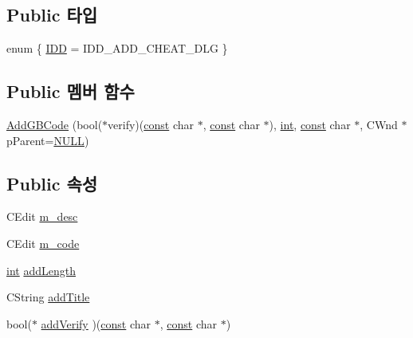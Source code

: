 \subsection*{Public 타입}
\begin{DoxyCompactItemize}
\item 
enum \{ \mbox{\hyperlink{class_add_g_b_code_a2dd2d84fa89620e9d1bd9816ac698df9a796ce5251d56e030eaec4941c10b6a17}{I\+DD}} = I\+D\+D\+\_\+\+A\+D\+D\+\_\+\+C\+H\+E\+A\+T\+\_\+\+D\+LG
 \}
\end{DoxyCompactItemize}
\subsection*{Public 멤버 함수}
\begin{DoxyCompactItemize}
\item 
\mbox{\hyperlink{class_add_g_b_code_a99be74c9c22f954a6a83fb1e8eba7b29}{Add\+G\+B\+Code}} (bool($\ast$verify)(\mbox{\hyperlink{getopt1_8c_a2c212835823e3c54a8ab6d95c652660e}{const}} char $\ast$, \mbox{\hyperlink{getopt1_8c_a2c212835823e3c54a8ab6d95c652660e}{const}} char $\ast$), \mbox{\hyperlink{_util_8cpp_a0ef32aa8672df19503a49fab2d0c8071}{int}}, \mbox{\hyperlink{getopt1_8c_a2c212835823e3c54a8ab6d95c652660e}{const}} char $\ast$, C\+Wnd $\ast$p\+Parent=\mbox{\hyperlink{_system_8h_a070d2ce7b6bb7e5c05602aa8c308d0c4}{N\+U\+LL}})
\end{DoxyCompactItemize}
\subsection*{Public 속성}
\begin{DoxyCompactItemize}
\item 
C\+Edit \mbox{\hyperlink{class_add_g_b_code_af67488ee0354c39ce9c818e7f389e74f}{m\+\_\+desc}}
\item 
C\+Edit \mbox{\hyperlink{class_add_g_b_code_a1336063b1498bee29c2a9df7273d8ca9}{m\+\_\+code}}
\item 
\mbox{\hyperlink{_util_8cpp_a0ef32aa8672df19503a49fab2d0c8071}{int}} \mbox{\hyperlink{class_add_g_b_code_abed904b4077498637455cbd6f829a742}{add\+Length}}
\item 
C\+String \mbox{\hyperlink{class_add_g_b_code_a436954b9aea5bac8b7063a6939f829ae}{add\+Title}}
\item 
bool($\ast$ \mbox{\hyperlink{class_add_g_b_code_a3c81ddb0e728491632442e95218f40cf}{add\+Verify}} )(\mbox{\hyperlink{getopt1_8c_a2c212835823e3c54a8ab6d95c652660e}{const}} char $\ast$, \mbox{\hyperlink{getopt1_8c_a2c212835823e3c54a8ab6d95c652660e}{const}} char $\ast$)
\end{DoxyCompactItemize}
